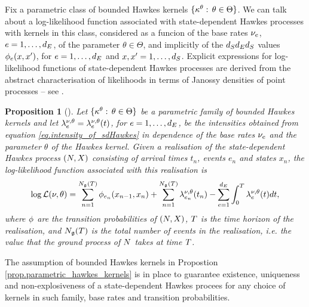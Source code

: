 \documentclass[10pt]{article}
\newtheorem{prop}[thm]{Proposition}
\begin{document}
Fix a parametric class of bounded Hawkes kernels $\lbrace\hawkesKernel^\theta : \, \theta \in \Theta \rbrace$. We can talk about a log-likelihood function associated with state-dependent Hawkes processes with kernels in this class, considered as a funcion of the base rates $\baseRate_e$, $e=1,\dots,\numEventTypes$, of the parameter $\theta \in \Theta$, and implicitly of the $\numStates\numEventTypes\numStates$ values $\transProb_{e}(x,\xone)$, for $e=1,\dots,\numEventTypes$ and $x,\xone=1,\dots,\numStates$. Explicit expressions for log-likelihood functions of state-dependent Hawkes processes are derived from the abstract characterisation of likelihoods in terms of Janossy densities of point processes -- see \citealp[Chapters 7 and 14]{DVJ08int}.
\begin{prop}[{\citealp[Theorem 3.1]{MP18sta}}]
 Let $\lbrace\hawkesKernel^\theta : \, \theta \in \Theta \rbrace$ be a parametric family of bounded Hawkes kernels and let $\intensity^{\baseRate,\theta}=\intensity^{\baseRate,\theta}(t)$, for $e=1,\dots, \numEventTypes$, be the intensities obtained from equation \eqref{eq.intensity_of_sdHawkes} in dependence of the base rates $\baseRate_e$ and the parameter $\theta$ of the Hawkes kernel.  Given a realisation of the state-dependent Hawkes process $(\multiCountingProc, \stateVariable)$ consisting of arrival times $t_n$, events $e_n$ and states $x_n$, the log-likelihood function associated with this realisation is 
 \begin{equation}\label{eq.loglikelihood_general}
  \log \likelihood (\nu,\theta) 
  =
  \sum_{n=1}^{\groundProc(\timeHorizon)} \transProb_{e_n}(x_{n-1},x_{n})
  +\sum_{n=1}^{\groundProc(\timeHorizon)} \intensity[e_{n}]^{\baseRate,\theta}(t_n)
  -\sum_{e=1}^{\numEventTypes} \int_{0}^{\timeHorizon} \intensity^{\baseRate,\theta}(t)dt, 
 \end{equation}
where $\transProb$ are the transition probabilities of $(\multiCountingProc, \stateVariable)$, $\timeHorizon$ is the time horizon of the realisation, and $\groundProc(\timeHorizon)$ is the total number of events in the realisation, i.e. the value that the ground process of  $\multiCountingProc$ takes at time $\timeHorizon$. 
\end{prop}
The assumption of bounded Hawkes kernels in Propostion \ref{prop.parametric_hawkes_kernels} is in place to guarantee existence, uniqueness and non-explosiveness of a state-dependent Hawkes procees for any choice of kernels in such family, base rates and transition probabilities.  
\end{document}
